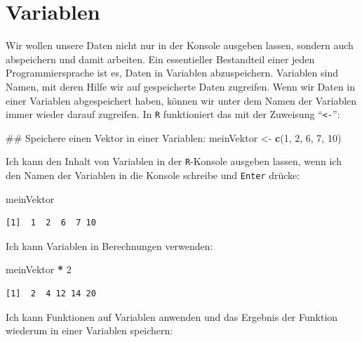 \documentclass[12pt,]{tufte-book}
\newenvironment{Shaded}{\begin{snugshade}}{\end{snugshade}}
\newcommand{\KeywordTok}[1]{\textcolor[rgb]{0.13,0.29,0.53}{\textbf{#1}}}
\newcommand{\DecValTok}[1]{\textcolor[rgb]{0.00,0.00,0.81}{#1}}
\newcommand{\StringTok}[1]{\textcolor[rgb]{0.31,0.60,0.02}{#1}}
\newcommand{\OperatorTok}[1]{\textcolor[rgb]{0.81,0.36,0.00}{\textbf{#1}}}
\newcommand{\NormalTok}[1]{#1}
\theoremstyle{definition}
\theoremstyle{definition}
\theoremstyle{definition}
\theoremstyle{remark}
\begin{document}
\section{Variablen}\label{variablen}

Wir wollen unsere Daten nicht nur in der Konsole ausgeben lassen,
sondern auch abspeichern und damit arbeiten. Ein essentieller
Bestandteil einer jeden Programmiersprache ist es, Daten in Variablen
abzuspeichern. Variablen sind Namen, mit deren Hilfe wir auf
gespeicherte Daten zugreifen. Wenn wir Daten in einer Variablen
abgespeichert haben, können wir unter dem Namen der Variablen immer
wieder darauf zugreifen. In \texttt{R} funktioniert das mit der
Zuweisung ``\texttt{\textless{}-}'':

\begin{Shaded}
\begin{Highlighting}[]
\NormalTok{## Speichere einen Vektor in einer Variablen:}
\NormalTok{meinVektor <-}\StringTok{ }\KeywordTok{c}\NormalTok{(}\DecValTok{1}\NormalTok{, }\DecValTok{2}\NormalTok{, }\DecValTok{6}\NormalTok{, }\DecValTok{7}\NormalTok{, }\DecValTok{10}\NormalTok{)}
\end{Highlighting}
\end{Shaded}

Ich kann den Inhalt von Variablen in der \texttt{R}-Konsole ausgeben
lassen, wenn ich den Namen der Variablen in die Konsole schreibe und
\texttt{Enter} drücke:

\begin{Shaded}
\begin{Highlighting}[]
\NormalTok{meinVektor}
\end{Highlighting}
\end{Shaded}

\begin{verbatim}
[1]  1  2  6  7 10
\end{verbatim}

Ich kann Variablen in Berechnungen verwenden:

\begin{Shaded}
\begin{Highlighting}[]
\NormalTok{meinVektor }\OperatorTok{*}\StringTok{ }\DecValTok{2}
\end{Highlighting}
\end{Shaded}

\begin{verbatim}
[1]  2  4 12 14 20
\end{verbatim}

Ich kann Funktionen auf Variablen anwenden und das Ergebnis der Funktion
wiederum in einer Variablen speichern:
\end{document}
